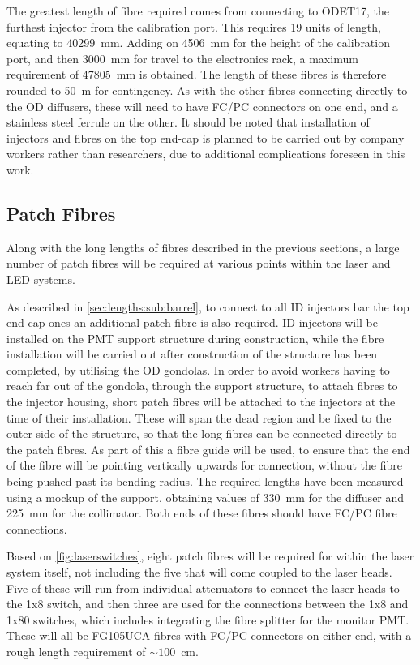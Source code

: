\documentclass[a4paper,11pt]{article}
\let\oldsim\sim
\renewcommand{\sim}{{\oldsim}}
\begin{document}
The greatest length of fibre required comes from connecting to ODET17, the furthest injector from the calibration port. This requires 19 units of length, equating to 40299~mm. Adding on 4506~mm for the height of the calibration port, and then 3000~mm for travel to the electronics rack, a maximum requirement of 47805~mm is obtained. The length of these fibres is therefore rounded to 50~m for contingency. As with the other fibres connecting directly to the OD diffusers, these will need to have FC/PC connectors on one end, and a stainless steel ferrule on the other. It should be noted that installation of injectors and fibres on the top end-cap is planned to be carried out by company workers rather than researchers, due to additional complications foreseen in this work.


\subsection{Patch Fibres}\label{sec:lengths:sub:patch}

Along with the long lengths of fibres described in the previous sections, a large number of patch fibres will be required at various points within the laser and LED systems.

As described in \cref{sec:lengths:sub:barrel}, to connect to all ID injectors bar the top end-cap ones an additional patch fibre is also required. ID injectors will be installed on the PMT support structure during construction, while the fibre installation will be carried out after construction of the structure has been completed, by utilising the OD gondolas. In order to avoid workers having to reach far out of the gondola, through the support structure, to attach fibres to the injector housing, short patch fibres will be attached to the injectors at the time of their installation. These will span the dead region and be fixed to the outer side of the structure, so that the long fibres can be connected directly to the patch fibres. As part of this a fibre guide will be used, to ensure that the end of the fibre will be pointing vertically upwards for connection, without the fibre being pushed past its bending radius. The required lengths have been measured using a mockup of the support, obtaining values of 330~mm for the diffuser and 225~mm for the collimator. Both ends of these fibres should have FC/PC fibre connections.

Based on \cref{fig:laserswitches}, eight patch fibres will be required for within the laser system itself, not including the five that will come coupled to the laser heads. Five of these will run from individual attenuators to connect the laser heads to the 1x8 switch, and then three are used for the connections between the 1x8 and 1x80 switches, which includes integrating the fibre splitter for the monitor PMT. These will all be FG105UCA fibres with FC/PC connectors on either end, with a rough length requirement of $\sim100$~cm.
\end{document}
